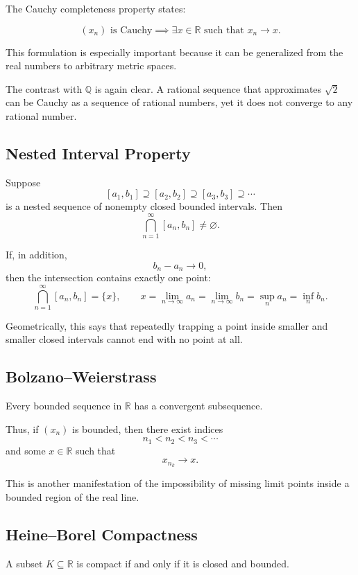 \documentclass{essay}
\begin{document}
The Cauchy completeness property states:

\[ (x_{n})\text{ is Cauchy} \implies \exists x\in\mathbb{R} \text{ such that } x_{n}\to x. \]

This formulation is especially important because it can be generalized from the real numbers to arbitrary metric spaces.

The contrast with \(\mathbb{Q}\) is again clear. A rational sequence that approximates \(\sqrt{2}\) can be Cauchy as a sequence of rational numbers, yet it does not converge to any rational number.

\subsection{Nested Interval Property}

Suppose
\[ [a_{1},b_{1}]\supseteq[a_{2},b_{2}]\supseteq[a_{3},b_{3}]\supseteq\cdots \]
is a nested sequence of nonempty closed bounded intervals. Then
\[ \bigcap_{n=1}^{\infty}[a_{n},b_{n}]\neq\varnothing. \]

If, in addition,
\[ b_{n}-a_{n}\to0, \]
then the intersection contains exactly one point:
\[ \bigcap_{n=1}^{\infty}[a_{n},b_{n}]=\{x\}, \qquad x=\lim_{n\to\infty}a_{n}=\lim_{n\to\infty}b_{n}=\sup_{n} a_{n}=\inf_{n} b_{n}. \]

Geometrically, this says that repeatedly trapping a point inside smaller and smaller closed intervals cannot end with no point at all.

\subsection{Bolzano--Weierstrass}

Every bounded sequence in \(\mathbb{R}\) has a convergent subsequence.

Thus, if \((x_{n})\) is bounded, then there exist indices
\[ n_{1}<n_{2}<n_{3}<\cdots \]
and some \(x\in\mathbb{R}\) such that
\[ x_{n_{k}}\to x. \]

This is another manifestation of the impossibility of missing limit points inside a bounded region of the real line.

\subsection{Heine--Borel Compactness}

A subset \(K\subseteq\mathbb{R}\) is compact if and only if it is closed and bounded.
\end{document}
